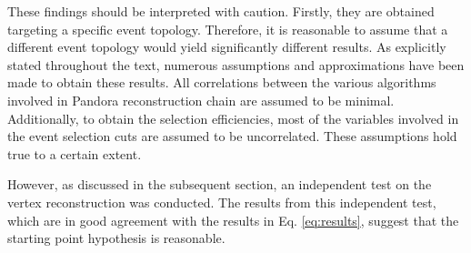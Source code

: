 These findings should be interpreted with caution. Firstly, they are obtained targeting a specific event topology. Therefore, it is reasonable to assume that a different event topology would yield significantly different results. As explicitly stated throughout the text, numerous assumptions and approximations have been made to obtain these results. All correlations between the various algorithms involved in Pandora reconstruction chain are assumed to be minimal. Additionally, to obtain the selection efficiencies, most of the variables involved in the event selection cuts are assumed to be uncorrelated. These assumptions hold true to a certain extent. 

However, as discussed in the subsequent section, an independent test on the vertex reconstruction was conducted. The results from this independent test, which are in good agreement with the results in Eq. \eqref{eq:results}, suggest that the starting point hypothesis is reasonable. 